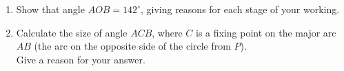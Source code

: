 \begin{question}
\begin{enumerate}
    \item[(a)] Show that angle $AOB = 142^\circ$, giving reasons for each stage of your working.

    \vspace{4cm}

    \item[(b)] Calculate the size of angle $ACB$, where $C$ is a fixing point on the major arc $AB$ (the arc on the opposite side of the circle from $P$).\\
    Give a reason for your answer.

    \vspace{4cm}
\end{enumerate}
\end{question}